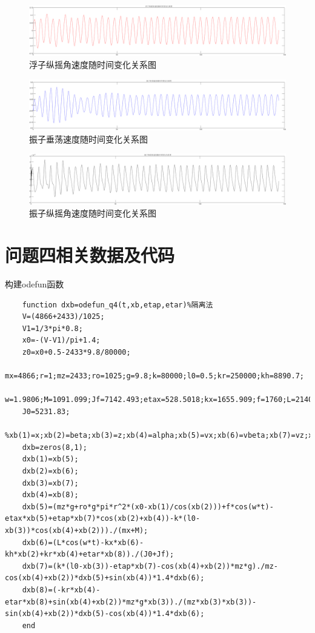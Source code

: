 \documentclass{article}
\numberwithin{equation}{subsection}
\begin{document}
\begin{figure}[H]
    \centering
    \includegraphics[scale=0.3]{问题3-6.png}
    \caption{浮子纵摇角速度随时间变化关系图}
\end{figure}
\begin{figure}[H]
    \centering
    \includegraphics[scale=0.3]{问题3-7.png}
    \caption{振子垂荡速度随时间变化关系图}
\end{figure}
\begin{figure}[H]
    \centering
    \includegraphics[scale=0.3]{问题3-8.png}
    \caption{振子纵摇角速度随时间变化关系图}
\end{figure}


\section{问题四相关数据及代码}

构建odefun函数
\begin{lstlisting}
    function dxb=odefun_q4(t,xb,etap,etar)%隔离法
    V=(4866+2433)/1025; 
    V1=1/3*pi*0.8; 
    x0=-(V-V1)/pi+1.4;
    z0=x0+0.5-2433*9.8/80000;
    mx=4866;r=1;mz=2433;ro=1025;g=9.8;k=80000;l0=0.5;kr=250000;kh=8890.7;
    w=1.9806;M=1091.099;Jf=7142.493;etax=528.5018;kx=1655.909;f=1760;L=2140;
    J0=5231.83;
    %xb(1)=x;xb(2)=beta;xb(3)=z;xb(4)=alpha;xb(5)=vx;xb(6)=vbeta;xb(7)=vz;xb(8)=valpha;
    dxb=zeros(8,1);
    dxb(1)=xb(5);
    dxb(2)=xb(6);
    dxb(3)=xb(7);
    dxb(4)=xb(8);
    dxb(5)=(mz*g+ro*g*pi*r^2*(x0-xb(1)/cos(xb(2)))+f*cos(w*t)-etax*xb(5)+etap*xb(7)*cos(xb(2)+xb(4))-k*(l0-xb(3))*cos(xb(4)+xb(2)))./(mx+M);
    dxb(6)=(L*cos(w*t)-kx*xb(6)-kh*xb(2)+kr*xb(4)+etar*xb(8))./(J0+Jf);
    dxb(7)=(k*(l0-xb(3))-etap*xb(7)-cos(xb(4)+xb(2))*mz*g)./mz-cos(xb(4)+xb(2))*dxb(5)+sin(xb(4))*1.4*dxb(6);
    dxb(8)=(-kr*xb(4)-etar*xb(8)+sin(xb(4)+xb(2))*mz*g*xb(3))./(mz*xb(3)*xb(3))-sin(xb(4)+xb(2))*dxb(5)-cos(xb(4))*1.4*dxb(6);
    end
\end{lstlisting}
\end{document}
